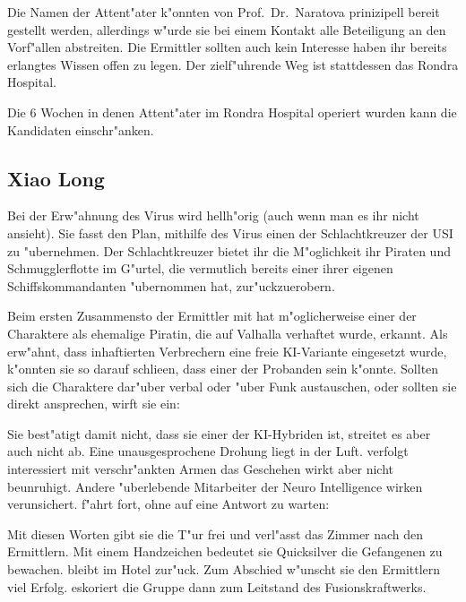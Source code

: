 \begin{remarks}
	Die Namen der Attent"ater k"onnten von Prof.~Dr.~Naratova prinizipell bereit gestellt werden, allerdings w"urde sie bei einem Kontakt alle Beteiligung an den Vorf"allen abstreiten. Die Ermittler sollten auch kein Interesse haben ihr bereits erlangtes Wissen offen zu legen. Der zielf"uhrende Weg ist stattdessen das Rondra Hospital.

	Die 6 Wochen in denen Attent"ater im Rondra Hospital operiert wurden kann die Kandidaten einschr"anken.
\end{remarks}

\subsection[\xl{}]{Xiao Long}
Bei der Erw"ahnung des Virus wird \xl{} hellh"orig (auch wenn man es ihr nicht ansieht). Sie fasst den Plan, mithilfe des Virus einen der Schlachtkreuzer der USI zu "ubernehmen. Der Schlachtkreuzer bietet ihr die M"oglichkeit ihr Piraten und Schmugglerflotte im G"urtel, die vermutlich bereits einer ihrer eigenen Schiffskommandanten "ubernommen hat, zur"uckzuerobern.

Beim ersten Zusammensto\3 der Ermittler mit \xl{} hat m"oglicherweise einer der Charaktere \xl{} als ehemalige Piratin, die auf Valhalla verhaftet wurde, erkannt. Als \ml{} erw"ahnt, dass inhaftierten Verbrechern eine freie KI-Variante eingesetzt wurde, k"onnten sie so darauf schlie\3en, dass \xl{} einer der Probanden sein k"onnte. Sollten sich die Charaktere dar"uber verbal oder "uber Funk austauschen, oder sollten sie \xl{} direkt ansprechen, wirft sie ein:


Sie best"atigt damit nicht, dass sie einer der KI-Hybriden ist, streitet es aber auch nicht ab. Eine unausgesprochene Drohung liegt in der Luft. \ml{} verfolgt interessiert mit verschr"ankten Armen das Geschehen wirkt aber nicht beunruhigt. Andere "uberlebende Mitarbeiter der Neuro Intelligence wirken verunsichert. \xl{} f"ahrt fort, ohne auf eine Antwort zu warten:


Mit diesen Worten gibt sie die T"ur frei und verl"asst das Zimmer nach den Ermittlern. Mit einem Handzeichen bedeutet sie Quicksilver die Gefangenen zu bewachen. \ml{} bleibt im Hotel zur"uck. Zum Abschied w"unscht sie den Ermittlern viel Erfolg. \xl{} eskoriert die Gruppe dann zum Leitstand des Fusionskraftwerks.

